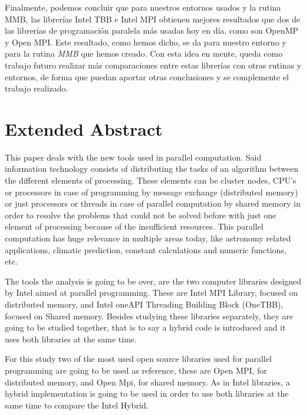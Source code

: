 \documentclass[a4paper,12pt]{article}
\begin{document}
Finalmente, podemos concluir que para nuestros entornos usados y la rutina MMB, las librerías Intel TBB e Intel MPI obtienen mejores resultados que dos de las librerías de programación paralela más usadas hoy en día, como son OpenMP y Open MPI. Este resultado, como hemos dicho, se da para nuestro entorno y para la rutina {\it MMB} que hemos creado. Con esta idea en mente, queda como trabajo futuro realizar más comparaciones entre estas librerías con otras rutinas y entornos, de forma que puedan aportar otras conclusiones y se complemente el trabajo realizado.




\newpage

\section*{Extended Abstract} %
\thispagestyle{empty}
This paper deals with the new tools used in parallel computation. Said information technology consists of distributing the tasks of an algorithm between the different elements of processing. These elements can be cluster nodes, CPU’s or processors in case of  programming by message exchange (distributed memory) or just processors or threads in case of parallel computation by shared memory in order to resolve the problems that could not be solved before with just one element of processing because of the insufficient resources. This parallel computation has huge relevance in multiple areas today, like astronomy related applications, climatic prediction, constant calculations and numeric functions, etc.




The tools the analysis is going to be over, are the two computer libraries designed by Intel aimed at parallel programming. These are Intel MPI Library, focused on distributed memory, and Intel oneAPI Threading Building Block (OneTBB), focused on Shared memory. Besides studying these libraries separately, they are going to be studied together, that is to say a hybrid code is introduced and it uses both libraries at the same time.

For this study two of the most used open source libraries used for parallel programming are going to be used as reference, these are Open MPI, for distributed memory, and Open Mpi, for shared memory. As in Intel libraries, a hybrid implementation is going to be used in order to use both libraries at the same time to compare the Intel Hybrid.
\end{document}
